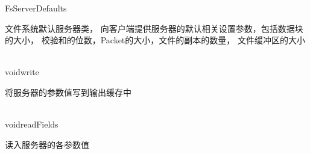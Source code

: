\begin{XeClass}{FsServerDefaults}
   
 文件系统默认服务器类，
 向客户端提供服务器的默认相关设置参数，包括数据块的大小，
 校验和的位数，Packet的大小，文件的副本的数量，
 文件缓冲区的大小

  \begin{XeMethod}{\XePublic\\ }{void}{write}
       
 将服务器的参数值写到输出缓存中

  \end{XeMethod}

  \begin{XeMethod}{\XePublic\\ }{void}{readFields}
       
 读入服务器的各参数值

  \end{XeMethod}

\end{XeClass}
